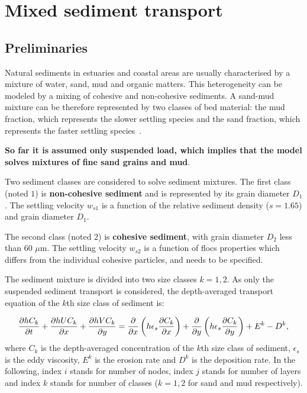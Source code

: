 \chapter[Mixed sediment]{Mixed sediment transport}

\section{Preliminaries}
Natural  sediments  in  estuaries  and  coastal  areas  are  usually characterised  by  a  mixture  of water, sand, mud and organic matters. This heterogeneity can be modeled by a mixing of cohesive and  non-cohesive sediments. A sand-mud mixture can be therefore represented by two classes of bed material: the mud fraction, which represents the slower settling species and the sand fraction, which represents the faster settling species~\cite{Lan12}.

\textbf{So far it is assumed only suspended load,
which implies that the model solves mixtures of fine sand grains and
mud}.

Two sediment classes are considered to solve sediment mixtures. The first class (noted $1$) is \textbf{non-cohesive sediment} and is represented by its grain diameter $D_1$. The
settling velocity $w_{s1}$ is a function of the relative sediment density
($s=1.65$) and grain diameter $D_1$. 

The second class (noted $2$) is \textbf{cohesive sediment}, with grain diameter $D_2$ less than $60$
$\mu$m. The settling velocity $w_{s2}$ is a function of flocs properties which
differs from the individual cohesive particles, and needs to be specified. 

The sediment mixture is divided into two size classes $k=1,2$. As only the suspended sediment transport is considered, the depth-averaged transport equation of the $k$th size class of sediment is:

\begin{equation}\label{eq:ADE}
\frac{\partial hC_k}{\partial t} + \frac{\partial hUC_k}{\partial
x} + \frac{\partial hVC_k}{\partial y} =\frac{\partial }{%
\partial x} \left(h\epsilon_s\frac{\partial C_k}{\partial x} \right) +%
\frac{\partial }{\partial y} \left( h\epsilon_s\frac{\partial C_k}{%
\partial y} \right)+E^k - D^k, 
\end{equation}%
where $C_k$ is the depth-averaged concentration of the $k$th size class of sediment, $\epsilon_s$ is the eddy viscosity, $E^k$ is the erosion rate and $D^k$ is the deposition rate. In the following, index $i$ stands for number of nodes, index $j$ stands for number of layers and index $k$ stands for number of classes ($k=1,2$ for sand and mud respectively).\\

